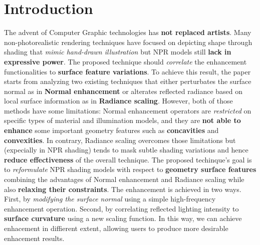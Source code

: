 \section{Introduction}
The advent of Computer Graphic technologies has \textbf{not replaced artists}. Many non-photorealistic rendering techniques have focused on depicting shape through shading that \textit{mimic hand-drawn illustration} but NPR models still \textbf{lack in expressive power}. \newline
The proposed technique should \textit{correlate} the enhancement functionalities to \textbf{surface feature variations}. To achieve this result, the paper \cite{referencePaper} starts from analyzing two existing techniques that either perturbates the surface normal as in \textbf{Normal enhancement} or alterates reflected radiance based on local surface information as in \textbf{Radiance scaling}. \newline
However, both of those methods have some limitations: \newline 
Normal enhancement operators are \textit{restricted} on specific types of material and illumination models, and they are \textbf{not able to enhance} some important geometry features such as \textbf{concavities} and \textbf{convexities}. In contrary, Radiance scaling overcomes those limitations but (expecially in NPR shading) tends to mask subtle shading variations and hence \textbf{reduce effectiveness} of the overall technique. \newline
The proposed techinque's goal is to \textit{reformulate} NPR shading models with respect to \textbf{geometry surface features} combining the advantages of Normal enhancement and Radiance scaling while also \textbf{relaxing their constraints}. \newline
The enhancement is achieved in two ways. First, by \textit{modifying the surface normal} using a simple high-frequency enhancement operation. Second, by correlating reflected lighting intensity to \textbf{surface curvature} using a new scaling function. \newline
In this way, we can achieve enhacement in diffierent extent, allowing users to produce more desirable enhacement results.

